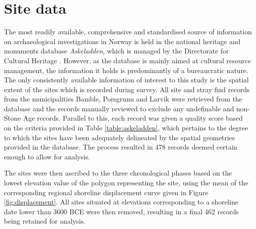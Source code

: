 \documentclass[12pt, a4paper]{article}
\begin{document}
\section{Site data}
The most readily available, comprehensive and standardised source of information on archaeological investigations in Norway is held in the national heritage and monuments database \textit{Askeladden}, which is managed by the Directorate for Cultural Heritage \citep{askeladden2018}. However, as the database is mainly aimed at cultural resource management, the information it holds is predominantly of a bureaucratic nature. The only consistently available information of interest to this study is the spatial extent of the sites which is recorded during survey. All site and stray find records from the municipalities Bamble, Porsgrunn and Larvik were retrieved from the database and the records manually reviewed to exclude any undefinable and non-Stone Age records. Parallel to this, each record was given a quality score based on the criteria provided in Table \ref{table:askeladden}, which pertains to the degree to which the sites have been adequately delineated by the spatial geometries provided in the database. The process resulted in 478 records deemed certain enough to allow for analysis.\par
The sites were then ascribed to the three chronological phases based on the lowest elevation value of the polygon representing the site, using the mean of the corresponding regional shoreline displacement curve given in Figure \ref{fig:displacement}. All sites situated at elevations corresponding to a shoreline date lower than 3600 BCE were then removed, resulting in a final 462 records being retained for analysis. \par  
\end{document}
